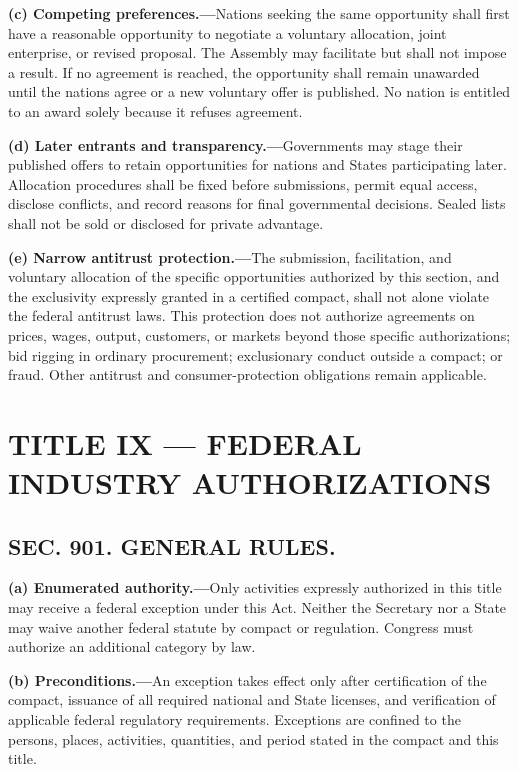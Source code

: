 \documentclass[12pt,letterpaper]{article}
\begin{document}
\textbf{(c) Competing preferences.---}Nations seeking the same opportunity shall first have a reasonable opportunity to negotiate a voluntary allocation, joint enterprise, or revised proposal. The Assembly may facilitate but shall not impose a result. If no agreement is reached, the opportunity shall remain unawarded until the nations agree or a new voluntary offer is published. No nation is entitled to an award solely because it refuses agreement.

\textbf{(d) Later entrants and transparency.---}Governments may stage their published offers to retain opportunities for nations and States participating later. Allocation procedures shall be fixed before submissions, permit equal access, disclose conflicts, and record reasons for final governmental decisions. Sealed lists shall not be sold or disclosed for private advantage.

\textbf{(e) Narrow antitrust protection.---}The submission, facilitation, and voluntary allocation of the specific opportunities authorized by this section, and the exclusivity expressly granted in a certified compact, shall not alone violate the federal antitrust laws. This protection does not authorize agreements on prices, wages, output, customers, or markets beyond those specific authorizations; bid rigging in ordinary procurement; exclusionary conduct outside a compact; or fraud. Other antitrust and consumer-protection obligations remain applicable.

\section*{TITLE IX --- FEDERAL INDUSTRY AUTHORIZATIONS}

\subsection*{SEC. 901. GENERAL RULES.}

\textbf{(a) Enumerated authority.---}Only activities expressly authorized in this title may receive a federal exception under this Act. Neither the Secretary nor a State may waive another federal statute by compact or regulation. Congress must authorize an additional category by law.

\textbf{(b) Preconditions.---}An exception takes effect only after certification of the compact, issuance of all required national and State licenses, and verification of applicable federal regulatory requirements. Exceptions are confined to the persons, places, activities, quantities, and period stated in the compact and this title.
\end{document}
